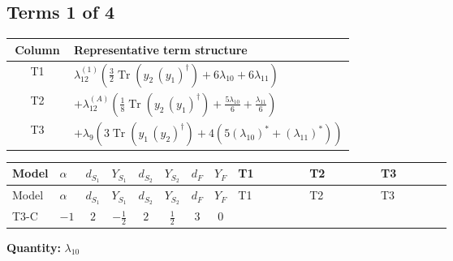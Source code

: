 \documentclass[8pt]{article}
\begin{document}
\begin{landscape}
\subsection*{Terms 1 of 4}
\begin{center}
\begin{tabular}{@{}c >{\raggedright\arraybackslash}p{0.82\linewidth}@{}}
\toprule
Column & Representative term structure \\
\midrule
T1 & \(\displaystyle {\lambda_{12}^{(1)}} \left(\frac{3}{2} \operatorname{Tr}\!\left({y_2}\,\left({y_1}\right)^{\dagger}\right)+6 {\lambda_{10}}+6 {\lambda_{11}}\right)\) \\
\midrule
T2 & \(\displaystyle +{\lambda_{12}^{(A)}} \left(\frac{1}{8} \operatorname{Tr}\!\left({y_2}\,\left({y_1}\right)^{\dagger}\right)+\frac{5 {\lambda_{10}}}{6}+\frac{{\lambda_{11}}}{6}\right)\) \\
\midrule
T3 & \(\displaystyle +{\lambda_{9}} (3 \operatorname{Tr}\!\left({y_1}\,\left({y_2}\right)^{\dagger}\right)+4 (5 \left({\lambda_{10}}\right)^{*}+\left({\lambda_{11}}\right)^{*}))\) \\
\midrule
\bottomrule
\end{tabular}
\end{center}
\smallskip
\tiny
\begin{longtable}{@{}llcccccc >{\raggedright\arraybackslash}p{0.21\linewidth} >{\raggedright\arraybackslash}p{0.21\linewidth} >{\raggedright\arraybackslash}p{0.21\linewidth}@{}}
\toprule
Model & $\alpha$ & $d_{S_1}$ & $Y_{S_1}$ & $d_{S_2}$ & $Y_{S_2}$ & $d_F$ & $Y_F$ & T1 & T2 & T3 \\
\midrule
\endfirsthead
\toprule
Model & $\alpha$ & $d_{S_1}$ & $Y_{S_1}$ & $d_{S_2}$ & $Y_{S_2}$ & $d_F$ & $Y_F$ & T1 & T2 & T3 \\
\midrule
\endhead
T3-C & $-1$ & $2$ & $-\frac{1}{2}$ & $2$ & $\frac{1}{2}$ & $3$ & $0$ & \scriptsize\adjustbox{max width=\linewidth}{$\begin{gathered} {\lambda_{12}^{(1)}} \left(\frac{3}{2} \operatorname{Tr}\!\left({y_2}\,\left({y_1}\right)^{\dagger}\right)+6 {\lambda_{10}}+6 {\lambda_{11}}\right)\end{gathered}$} & \scriptsize\adjustbox{max width=\linewidth}{$\begin{gathered} +{\lambda_{12}^{(A)}} \left(\frac{1}{8} \operatorname{Tr}\!\left({y_2}\,\left({y_1}\right)^{\dagger}\right)+\frac{5 {\lambda_{10}}}{6}+\frac{{\lambda_{11}}}{6}\right)\end{gathered}$} & \scriptsize\adjustbox{max width=\linewidth}{$\begin{gathered} +{\lambda_{9}} (3 \operatorname{Tr}\!\left({y_1}\,\left({y_2}\right)^{\dagger}\right)+4 (5 \left({\lambda_{10}}\right)^{*}+\left({\lambda_{11}}\right)^{*}))\end{gathered}$} \\
\midrule
\bottomrule
\end{longtable}
\clearpage
\noindent\textbf{Quantity: }$\lambda_{10}$\par\smallskip

\end{landscape}
\end{document}
